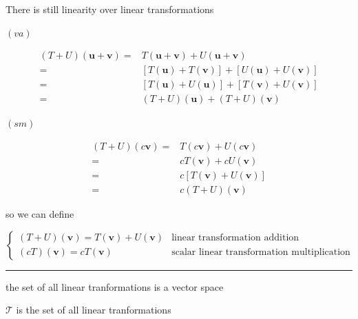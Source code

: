 \documentclass[
]{book}
\theoremstyle{definition}
\theoremstyle{definition}
\theoremstyle{definition}
\theoremstyle{definition}
\theoremstyle{remark}
\begin{document}
There is still linearity over linear transformations

\(\left(va\right)\)

\[
\begin{aligned}
\left(T+U\right)\left(\boldsymbol{u}+\boldsymbol{v}\right)= & T\left(\boldsymbol{u}+\boldsymbol{v}\right)+U\left(\boldsymbol{u}+\boldsymbol{v}\right)\\
= & \left[T\left(\boldsymbol{u}\right)+T\left(\boldsymbol{v}\right)\right]+\left[U\left(\boldsymbol{u}\right)+U\left(\boldsymbol{v}\right)\right]\\
= & \left[T\left(\boldsymbol{u}\right)+U\left(\boldsymbol{u}\right)\right]+\left[T\left(\boldsymbol{v}\right)+U\left(\boldsymbol{v}\right)\right]\\
= & \left(T+U\right)\left(\boldsymbol{u}\right)+\left(T+U\right)\left(\boldsymbol{v}\right)
\end{aligned}
\]

\(\left(sm\right)\)

\[
\begin{aligned}
\left(T+U\right)\left(c\boldsymbol{v}\right)= & T\left(c\boldsymbol{v}\right)+U\left(c\boldsymbol{v}\right)\\
= & cT\left(\boldsymbol{v}\right)+cU\left(\boldsymbol{v}\right)\\
= & c\left[T\left(\boldsymbol{v}\right)+U\left(\boldsymbol{v}\right)\right]\\
= & c\left(T+U\right)\left(\boldsymbol{v}\right)
\end{aligned}
\]

so we can define

\[
\begin{cases}
\left(T+U\right)\left(\boldsymbol{v}\right)=T\left(\boldsymbol{v}\right)+U\left(\boldsymbol{v}\right) & \text{linear transformation addition}\\
\left(cT\right)\left(\boldsymbol{v}\right)=cT\left(\boldsymbol{v}\right) & \text{scalar linear transformation multiplication}
\end{cases}
\]

\begin{center}\rule{0.5\linewidth}{0.5pt}\end{center}

the set of all linear tranformations is a vector space

\(\mathcal{T}\) is the set of all linear tranformations
\end{document}
